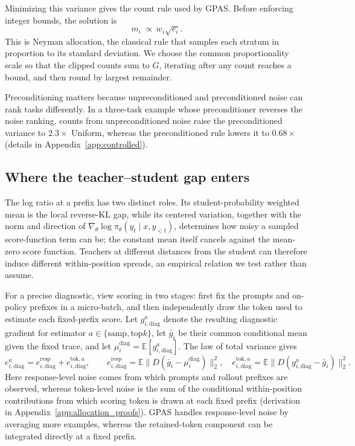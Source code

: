 Minimizing this variance gives the count rule used by GPAS. Before enforcing
integer bounds, the solution is
\begin{equation}
    m_i\ \propto\ w_i\sqrt{e_i}.
    \label{eq:batch_gpas_allocation}
\end{equation}
This is Neyman allocation, the classical rule that samples each stratum in
proportion to its standard deviation. We choose the common proportionality
scale so that the clipped counts sum to $G$, iterating after any count reaches
a bound, and then round by largest remainder.

Preconditioning matters because unpreconditioned and preconditioned noise can
rank tasks differently. In a three-task example whose preconditioner reverses
the noise ranking, counts from unpreconditioned noise raise the preconditioned
variance to $2.3\times$ Uniform, whereas the preconditioned rule lowers it to
$0.68\times$ (details in Appendix~\ref{app:controlled}).

\subsection{Where the teacher--student gap enters}
\label{sec:gap_noise}

The log ratio at a prefix has two distinct roles. Its student-probability
weighted mean is the local reverse-KL gap, while its centered variation,
together with the norm and direction of
$\nabla_\theta\log\pi_\theta(y_t\mid x,y_{<t})$, determines how noisy a sampled
score-function term can be; the constant mean itself cancels against the
mean-zero score function. Teachers at different distances from the student can
therefore induce different within-position spreads, an empirical relation we
test rather than assume.

For a precise diagnostic, view scoring in two stages: first fix the prompts and
on-policy prefixes in a micro-batch, and then independently draw the token used
to estimate each fixed-prefix score. Let $g_{i,\mathrm{diag}}^a$ denote the
resulting diagnostic gradient for estimator
$a\in\{\mathrm{samp},\mathrm{top}k\}$, let $\bar g_i$ be their common
conditional mean given the fixed trace, and let
$\mu_i^{\mathrm{diag}}=\mathbb E[g_{i,\mathrm{diag}}^a]$. The law of total
variance gives
\[
    e_{i,\mathrm{diag}}^a
      =e_{i,\mathrm{diag}}^{\mathrm{resp}}
       +e_{i,\mathrm{diag}}^{\mathrm{tok},a},\qquad
    e_{i,\mathrm{diag}}^{\mathrm{resp}}
      =\mathbb E\bigl\|D(\bar g_i-\mu_i^{\mathrm{diag}})\bigr\|_2^2,
    \quad
    e_{i,\mathrm{diag}}^{\mathrm{tok},a}
      =\mathbb E\bigl\|D(g_{i,\mathrm{diag}}^a-\bar g_i)\bigr\|_2^2.
\]
Here response-level noise comes from which prompts and rollout prefixes are
observed, whereas token-level noise is the sum of the conditional
within-position contributions from which scoring token is drawn at each fixed
prefix (derivation in Appendix~\ref{app:allocation_proofs}). GPAS handles
response-level noise by averaging more examples, whereas the retained-token
component can be integrated directly at a fixed prefix.

